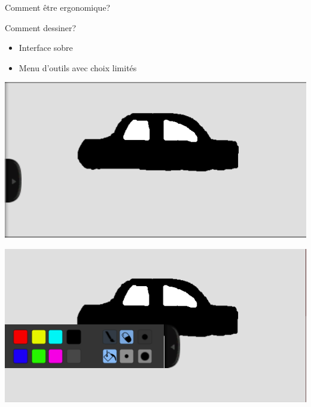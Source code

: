 \documentclass[a4paper,10pt]{beamer}
\begin{document}
		\begin{frame}{Comment être ergonomique?}

				Comment dessiner?
					\begin{itemize}
						\item Interface sobre
						\item Menu d'outils avec choix limités
					\end{itemize}
				
				\centerline{\includegraphics[scale=0.3]{images/Nono/img1.png}} \centerline{\includegraphics[scale=0.3]{images/Nono/img2.png}}
			


		\end{frame}	
		
\end{document}
